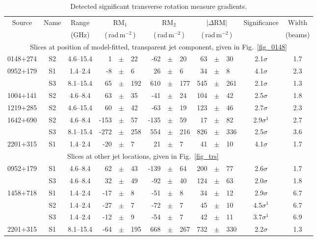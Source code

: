 \documentclass[a4paper,fleqn,usenatbib,useAMS]{mnras}
\newcommand{\rmu}{\,rad\,m$^{-2}$\,} %
\begin{document}
\begin{table*}
 \centering
 \begin{minipage}{175mm}
  \caption{Detected significant transverse rotation measure gradients.}
  \begin{tabular}{cccr@{}c@{}lr@{}c@{}lr@{}c@{}lcc}
 \hline
 Source&Name&Range&\multicolumn{3}{c}{$\mathrm{RM}_1$}&\multicolumn{3}{c}{$\mathrm{RM}_2$}&\multicolumn{3}{c}{$|\Delta\mathrm{RM}|$}&Significance&Width\\
 &&(GHz)&\multicolumn{3}{c}{(\rmu)}&\multicolumn{3}{c}{(\rmu)}&\multicolumn{3}{c}{(\rmu)}&&(beams)\\
  \hline
\multicolumn{14}{c}{Slices at position of model-fitted, transparent jet component, given in Fig.~\ref{fig_0148}}\\
0148$+$274&S2&4.6--15.4&1&$\pm$&22&-62&$\pm$&20&63&$\pm$&30&2.1$\sigma$&1.7\\
0952$+$179&S1&1.4--2.4&-8&$\pm$&6&26&$\pm$&6&34&$\pm$&8&4.1$\sigma$&2.3\\
 &S3&8.1--15.4&65&$\pm$&192&610&$\pm$&177&545&$\pm$&261&2.1$\sigma$&1.3\\
1004$+$141&S2&4.6--8.4&63&$\pm$&35&-41&$\pm$&24&104&$\pm$&42&2.5$\sigma$&1.8\\
1219$+$285&S2&4.6--15.4&60&$\pm$&42&-63&$\pm$&19&123&$\pm$&46&2.7$\sigma$&2.3\\
1642$+$690&S2&4.6--8.4&-153&$\pm$&57&-135&$\pm$&59&17&$\pm$&82&2.9$\sigma^\mathrm{1}$&2.7\\
 &S3&8.1--15.4&-272&$\pm$&258&554&$\pm$&216&826&$\pm$&336&2.5$\sigma$&3.6\\
 2201$+$315&S1&1.4--2.4&-20&$\pm$&7&21&$\pm$&7&41&$\pm$&10&4.1$\sigma$&1.7\\
\multicolumn{13}{c}{Slices at other jet locations, given in Fig.~\ref{fig_trs}}\\
0952$+$179&S1&4.6--8.4&62&$\pm$&43&-139&$\pm$&64&200&$\pm$&77&2.6$\sigma$&1.7\\
	  &S3&4.6--8.4&32&$\pm$&49&-92&$\pm$&40&124&$\pm$&63&2.0$\sigma$&1.8\\
1458$+$718&S1&1.4--2.4&-17&$\pm$&8&-51&$\pm$&8&34&$\pm$&12&2.9$\sigma$&6.7\\
	  &S2&1.4--2.4&-27&$\pm$&7&-72&$\pm$&7&45&$\pm$&10&4.5$\sigma^\mathrm{1}$&6.7\\
	  &S3&1.4--2.4&-12&$\pm$&9&-54&$\pm$&7&42&$\pm$&11&3.7$\sigma^\mathrm{1}$&6.9\\
2201$+$315&S1&8.1--15.4&-64&$\pm$&195&668&$\pm$&267&732&$\pm$&330&2.2$\sigma$&1.3\\
\hline
\end{tabular}
\smallskip


\end{minipage}
\end{table*}
\end{document}
